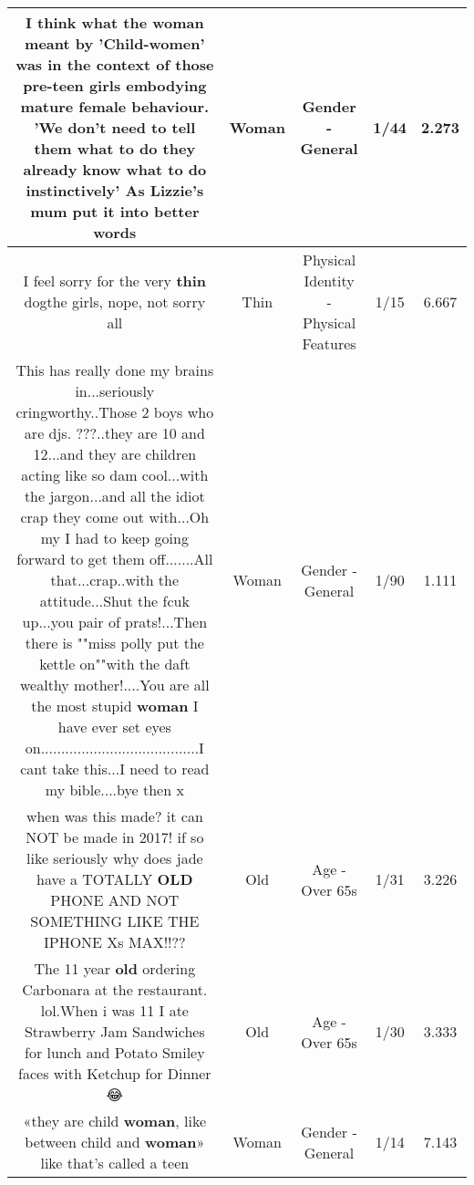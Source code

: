 \documentclass[11pt]{article}
\newlength\mylength
\begin{document}
\begin{center}
\begin{longtable}{|C{.65\mylength}|C{.30\mylength}|C{.12\mylength}|C{.12\mylength}|C{.12\mylength}|}
  \small I think what the \textbf{woman} meant by 'Child-women' was in the context of those pre-teen girls embodying mature female behaviour. 'We don't need to tell them what to do they already know what to do instinctively' As Lizzie's mum put it into better words\normalsize   & Woman & Gender - General & 1/44 & 2.273 \\  \hline
  \small I feel sorry for the very \textbf{thin} dogthe girls, nope, not sorry \@ all\normalsize   & Thin & Physical Identity - Physical Features & 1/15 & 6.667 \\  \hline
  \small This has really done my brains in...seriously cringworthy..Those 2 boys who are djs. ???..they are 10 and 12...and they are children acting like so dam cool...with the jargon...and all the idiot crap they come out with...Oh my I had to keep going forward to get them off.......All that...crap..with the attitude...Shut the fcuk up...you pair of prats!...Then there is ""miss polly put the kettle on""with the daft wealthy mother!....You are all the most stupid \textbf{woman} I have ever set eyes on.......................................I cant take this...I need to read my bible....bye then   x\normalsize   & Woman & Gender - General & 1/90 & 1.111 \\  \hline
  \small when was this made? it can NOT be made in 2017! if so like seriously why does jade have a TOTALLY \textbf{OLD} PHONE AND NOT SOMETHING LIKE THE IPHONE Xs MAX!!??\normalsize   & Old & Age - Over 65s & 1/31 & 3.226 \\  \hline
  \small The 11 year \textbf{old} ordering Carbonara at the restaurant. lol.When i was 11 I ate Strawberry Jam Sandwiches for lunch and Potato Smiley faces with Ketchup for Dinner  😂\normalsize   & Old & Age - Over 65s & 1/30 & 3.333 \\  \hline
  \small «they are child \textbf{woman}, like between child and \textbf{woman}» like that's called a teen\normalsize   & Woman & Gender - General & 1/14 & 7.143 \\  \hline

\end{longtable}
\end{center}
\end{document}
